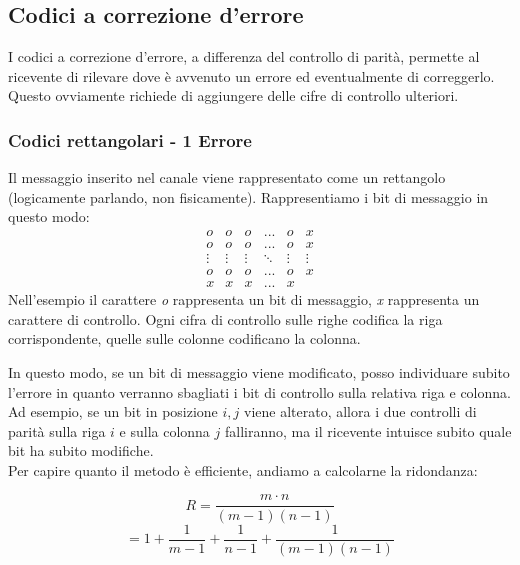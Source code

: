 \subsection*{Codici a correzione d'errore}
I codici a correzione d'errore, a differenza del controllo di parità, permette al ricevente di rilevare dove è avvenuto un errore ed eventualmente di correggerlo.
Questo ovviamente richiede di aggiungere delle cifre di controllo ulteriori.

\newpage
\subsubsection*{Codici rettangolari - 1 Errore}
Il messaggio inserito nel canale viene rappresentato come un rettangolo (logicamente parlando, non fisicamente).
Rappresentiamo i bit di messaggio in questo modo:
\medskip
\begin{equation*}
\begin{matrix}
\textit{o} & \textit{o} & \textit{o} & ... & \textit{o} & x\\
\textit{o} & \textit{o} & \textit{o} & ... & \textit{o} & x\\
\vdots & \vdots & \vdots & \ddots & \vdots & \vdots\\
\textit{o} & \textit{o} & \textit{o} & ... & \textit{o} & x\\
x & x & x & ... & x & 
\end{matrix}
\end{equation*}
Nell'esempio il carattere \textit{o} rappresenta un bit di messaggio, \textit{x} rappresenta un carattere di controllo.
Ogni cifra di controllo sulle righe codifica la riga corrispondente, quelle sulle colonne codificano la colonna.

In questo modo, se un bit di messaggio viene modificato, posso individuare subito l'errore in quanto verranno sbagliati i bit di controllo sulla relativa riga e colonna.
Ad esempio, se un bit in posizione $i, j$ viene alterato, allora i due controlli di parità sulla riga $i$ e sulla colonna $j$ falliranno, ma il ricevente intuisce subito quale bit ha subito modifiche.\\

Per capire quanto il metodo è efficiente, andiamo a calcolarne la ridondanza:

\begin{equation}
R = \frac{m \cdot n}{(m-1)(n-1)}
\end{equation}
\begin{equation*}
= 1 + \frac{1}{m-1} + \frac{1}{n-1} + \frac{1}{(m-1)(n-1)}
\end{equation*}

